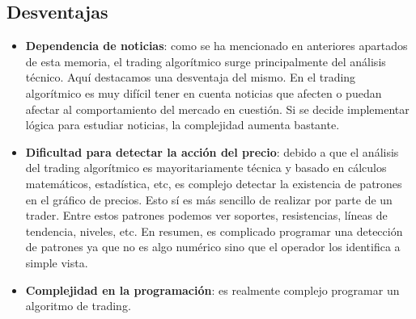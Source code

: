 \subsection{Desventajas}

\begin{itemize}
	
	\item \textbf{Dependencia de noticias}: como se ha mencionado en anteriores apartados de esta memoria, el trading algorítmico surge principalmente del análisis técnico. Aquí destacamos una desventaja del mismo. En el trading algorítmico es muy difícil tener en cuenta noticias que afecten o puedan afectar al comportamiento del mercado en cuestión. Si se decide implementar lógica para estudiar noticias, la complejidad aumenta bastante.
	\item \textbf{Dificultad para detectar la acción del precio}: debido a que el análisis del trading algorítmico es mayoritariamente técnica y basado en cálculos matemáticos, estadística, etc, es complejo detectar la existencia de patrones en el gráfico de precios. Esto sí es más sencillo de realizar por parte de un trader. Entre estos patrones podemos ver soportes, resistencias, líneas de tendencia, niveles, etc. En resumen, es complicado programar una detección de patrones ya que no es algo numérico sino que el operador los identifica a simple vista.
	\item \textbf{Complejidad en la programación}: es realmente complejo programar un algoritmo de trading.
	
\end{itemize}
